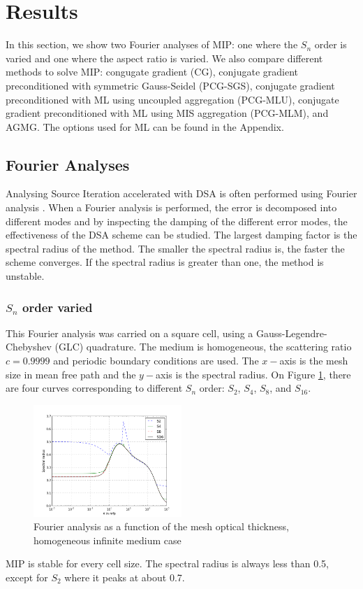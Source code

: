 \section{Results} \label{sec_res}
In this section, we show two Fourier analyses of MIP: one where the $S_n$ order is
varied and one where the aspect ratio is varied. We also compare different
methods to solve MIP: congugate gradient (CG), conjugate gradient
preconditioned with symmetric Gauss-Seidel (PCG-SGS), conjugate gradient
preconditioned with ML using uncoupled aggregation (PCG-MLU),
conjugate gradient preconditioned with ML using MIS aggregation (PCG-MLM),
and AGMG. The options used for ML can be found in the Appendix.
\subsection{Fourier Analyses}
Analysing Source Iteration accelerated with DSA is often performed using
Fourier analysis \cite{larsen_dsa,consistent_p1}. When a Fourier analysis is
performed, the error is decomposed into different modes and by inspecting the 
damping of the different error modes, the effectiveness of the DSA scheme can 
be studied. The largest damping factor is the spectral radius of the method. 
The smaller the spectral radius is, the faster the scheme converges. If the 
spectral radius is greater than one, the method is unstable. 
\subsubsection{$S_n$ order varied}
This Fourier analysis was carried on a square cell, using a
Gauss-Legendre-Chebyshev (GLC) quadrature. The medium is homogeneous, the scattering
ratio $c=0.9999$ and periodic boundary conditions are used. The $x-$axis is the mesh
size in mean free path and the $y-$axis is the spectral radius. On Figure
\ref{fig_fa_op}, there are four curves corresponding to different $S_n$ order: 
$S_2$, $S_4$, $S_8$, and $S_{16}$.
\begin{figure}[H]
  \centering
  \includegraphics[width=0.5\textwidth]{./Dsa/sn_order_9999}
  \caption{Fourier analysis as a function of the mesh optical thickness,
  homogeneous infinite medium case}
  \label{fig_fa_op}
\end{figure}
MIP is stable for every cell size. The spectral radius is always less than
0.5, except for $S_2$ where it peaks at about 0.7.
